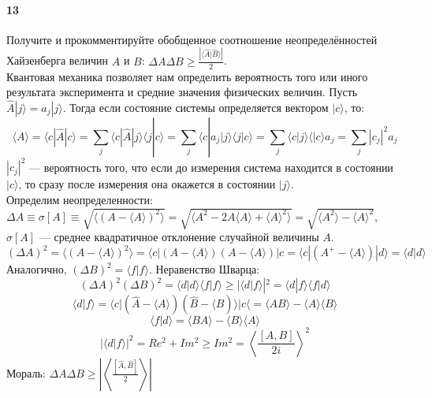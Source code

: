 


\paragraph{13} Получите и прокомментируйте обобщенное соотношение неопределённостей Хайзенберга величин $A$ и $B$: $\Delta A\Delta B \ge \frac{\left|\langle\hat{A} | \hat{B}\rangle\right|}{2}$.\\

Квантовая механика позволяет нам определить вероятность того или иного результата эксперимента и средние значения физических величин. Пусть $\hat{A}|j\rangle=a_j|j\rangle$. Тогда если состояние системы определяется вектором $|c\rangle$, то:
$$
\langle A \rangle =\langle c|\hat{A}|c \rangle = \sum_j \langle c | \hat{A}|j\rangle \langle j|c\rangle = \sum_j \langle c| a_j|j\rangle \langle j|c\rangle = \sum_j\langle c|j\rangle \langle | c \rangle a_j=\sum_j |c_j|^2a_j
$$
$|c_j|^2$ --- вероятность того, что если до измерения система находится в состоянии $|c\rangle$, то сразу после измерения она окажется в состоянии $|j\rangle$.\\

Определим неопределенности: $\Delta A \equiv \sigma[A]\equiv \sqrt{\langle (A-\langle A\rangle)^2\rangle} = \sqrt{\langle A^2-2A\langle A \rangle+\langle A \rangle^2\rangle}=\sqrt{\langle A^2\rangle-\langle A\rangle^2}$, $\sigma [A]$ --- среднее квадратичное отклонение случайной величины $A$.\\
$$
(\Delta A)^2=\langle (A-\langle A\rangle )^2\rangle = \langle c|(A-\langle A\rangle)(A-\langle A\rangle )|c=\langle c|(A^+-\langle A\rangle)|d\rangle = \langle d|d\rangle 
$$
Аналогично, $(\Delta B)^2=\langle f| f \rangle$. Неравенство Шварца:
$$
(\Delta A)^2 (\Delta B)^2 = \langle d|d\rangle \langle f|f \rangle \geqslant |\langle d|f\rangle|^2 = \langle d|f\rangle \langle f|d\rangle
$$
$$
\langle d|f \rangle = \langle c|(\hat{A}-\langle A \rangle)(\hat{B}-\langle B) \rangle | c \langle =\langle AB \rangle -\langle A \rangle \langle B \rangle
$$
$$
\langle f|d \rangle = \langle BA \rangle -\langle B \rangle \langle A \rangle
$$
$$
|\langle d|f \rangle |^2 = Re^2 + Im^2 \geqslant Im^2 = \left \langle \frac{[A, B]}{2i}\right \rangle^2 
$$
Мораль: $\Delta A \Delta B \geqslant \left|\left \langle \frac{[\hat{A}, \hat{B}]}{2}\right \rangle \right|$
